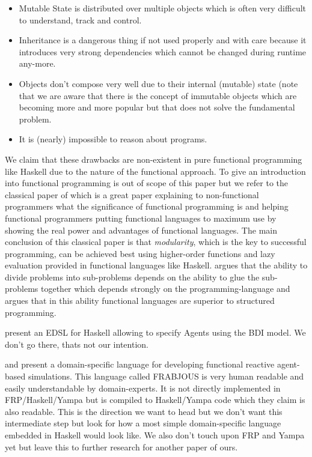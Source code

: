 \begin{itemize}
\item Mutable State is distributed over multiple objects which is often very difficult to understand, track and control.
\item Inheritance is a dangerous thing if not used properly and with care because it introduces very strong dependencies which cannot be changed during runtime any-more.
\item Objects don't compose very well due to their internal (mutable) state (note that we are aware that there is the concept of immutable objects which are becoming more and more popular but that does not solve the fundamental problem.
\item It is (nearly) impossible to reason about programs.
\end{itemize}

We claim that these drawbacks are non-existent in pure functional programming like Haskell due to the nature of the functional approach. To give an introduction into functional programming is out of scope of this paper but we refer to the classical paper of \cite{hughes_why_1989} which is a great paper explaining to non-functional programmers what the significance of functional programming is and helping functional programmers putting functional languages to maximum use by showing the real power and advantages of functional languages. The main conclusion of this classical paper is that \textit{modularity}, which is the key to successful programming, can be achieved best using higher-order functions and lazy evaluation provided in functional languages like Haskell. \cite{hughes_why_1989} argues that the ability to divide problems into sub-problems depends on the ability to glue the sub-problems together which depends strongly on the programming-language and \cite{hughes_why_1989} argues that in this ability functional languages are superior to structured programming.

\cite{sulzmann_specifying_2007} present an EDSL for Haskell allowing to specify Agents using the BDI model. We don't go there, thats not our intention. 

\cite{schneider_towards_2012} and \cite{vendrov_frabjous:_2014} present a domain-specific language for developing functional reactive agent-based simulations. This language called FRABJOUS is very human readable and easily understandable by domain-experts. It is not directly implemented in FRP/Haskell/Yampa but is compiled to Haskell/Yampa code which they claim is also readable. This is the direction we want to head but we don't want this intermediate step but look for how a most simple domain-specific language embedded in Haskell would look like. We also don't touch upon FRP and Yampa yet but leave this to further research for another paper of ours.

